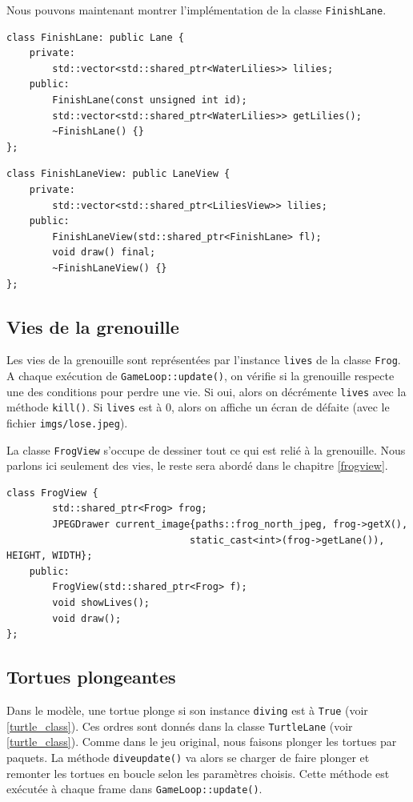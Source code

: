 \documentclass[a4paper, 12pt]{article}
\begin{document}
Nous pouvons maintenant montrer l'implémentation de la classe \texttt{FinishLane}.

\begin{lstlisting}
class FinishLane: public Lane {
    private:
        std::vector<std::shared_ptr<WaterLilies>> lilies;
    public:
        FinishLane(const unsigned int id);
        std::vector<std::shared_ptr<WaterLilies>> getLilies();
        ~FinishLane() {}
};
\end{lstlisting} 

\begin{lstlisting}
class FinishLaneView: public LaneView {
    private:
        std::vector<std::shared_ptr<LiliesView>> lilies;
    public:
        FinishLaneView(std::shared_ptr<FinishLane> fl);
        void draw() final;
        ~FinishLaneView() {}
};
\end{lstlisting}

\subsection{Vies de la grenouille} \label{lives}

Les vies de la grenouille sont représentées par l'instance \texttt{lives} de la classe 
\texttt{Frog}. 
A chaque exécution de \texttt{GameLoop::update()}, 
on vérifie si la grenouille respecte une des conditions pour perdre une vie. 
Si oui, alors on décrémente \texttt{lives} avec la méthode \texttt{kill()}. 
Si \texttt{lives} est à 0, 
alors on affiche un écran de défaite (avec le fichier \texttt{imgs/lose.jpeg}).

La classe \texttt{FrogView} s'occupe de dessiner tout ce qui est relié à la grenouille. 
Nous parlons ici seulement des vies, le reste sera abordé dans le chapitre \ref{frogview}. 

\begin{lstlisting}
class FrogView {    
        std::shared_ptr<Frog> frog;
        JPEGDrawer current_image{paths::frog_north_jpeg, frog->getX(),
                                static_cast<int>(frog->getLane()), HEIGHT, WIDTH};
    public:
        FrogView(std::shared_ptr<Frog> f);
        void showLives();
        void draw();
};
\end{lstlisting}

\subsection{Tortues plongeantes} \label{diving_turtles}

Dans le modèle, 
une tortue plonge si son instance \texttt{diving} est à \texttt{True} (voir \ref{turtle_class}). 
Ces ordres sont donnés dans la classe \texttt{TurtleLane} (voir \ref{turtle_class}). 
Comme dans le jeu original, nous faisons plonger les tortues par paquets. 
La méthode \texttt{dive\textunderscore update()} va alors se charger de faire plonger et 
remonter les tortues en boucle selon les paramètres choisis. 
Cette méthode est exécutée à chaque frame dans \texttt{GameLoop::update()}.
\end{document}
